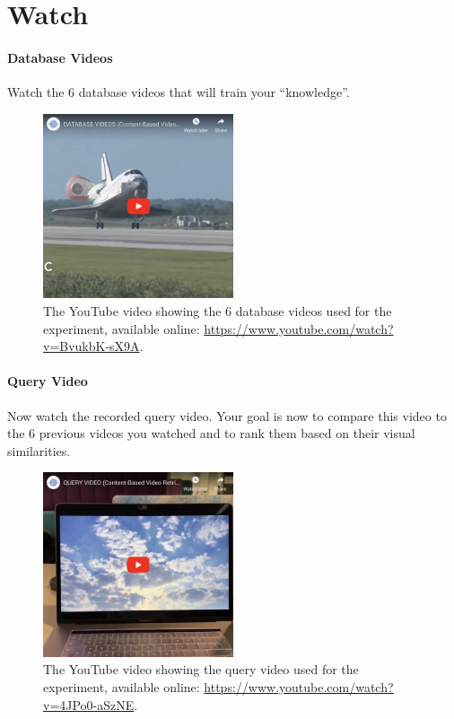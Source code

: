 \section{Watch}

\paragraph{Database Videos}

Watch the 6 database videos that will train your ``knowledge''.

\begin{figure}[h] 
\centerline{\includegraphics[width=0.50\textwidth]{figures/appendix/survey_db_videos.png}}
\caption{\label{fig:appendix-survey_db_videos}The YouTube video showing the 6 database videos used for the experiment, available online: \url{https://www.youtube.com/watch?v=BvukbK-sX9A}.}
\end{figure}

\paragraph{Query Video}

Now watch the recorded query video. Your goal is now to compare this video to the 6 previous videos you watched and to rank them based on their visual similarities.

\begin{figure}[h] 
\centerline{\includegraphics[width=0.5\textwidth]{figures/appendix/survey_query_video.png}}
\caption{\label{fig:appendix-survey_query_video}The YouTube video showing the query video used for the experiment, available online: \url{https://www.youtube.com/watch?v=4JPo0-aSzNE}.}
\end{figure}

